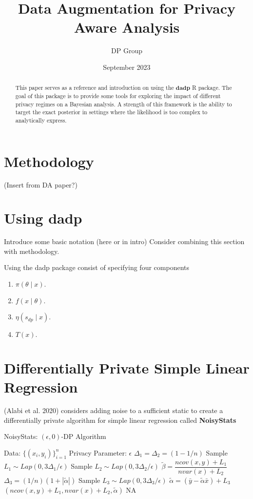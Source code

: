 \documentclass{article}\usepackage[]{graphicx}\usepackage[]{xcolor}
\title{Data Augmentation for Privacy Aware Analysis}
\author{DP Group}
\date{September 2023}
\theoremstyle{definition}
\newcommand{\dpn}{\textbf{dadp}}
\begin{document}
\maketitle

\begin{abstract}
    This paper serves as a reference and introduction on using the $\dpn$ R
    package. The goal of this package is to provide some tools for exploring the
    impact of different privacy regimes on a Bayesian analysis. A strength of
    this framework is the ability to target the exact posterior in settings
    where the likelihood is too complex to analytically express.
\end{abstract}

\section*{Methodology}
(Insert from DA paper?)



\section*{Using dadp}
Introduce some basic notation (here or in intro)
Consider combining this section with methodology.



Using the dadp package consist of specifying four components
\begin{enumerate}
  \item $\pi(\theta \mid x)$.
  \item $f(x \mid \theta)$.
  \item $\eta(s_{dp} \mid x)$.
  \item $T(x)$.
\end{enumerate}



\section*{Differentially Private Simple Linear Regression}

(Alabi et al. 2020)\cite{alabi2020} considers adding noise to a sufficient static
to create a differentially private algorithm for simple linear regression
called \textbf{NoisyStats}


\begin{algorithm}
\begin{algorithmic}[1]
\caption{NoisyStats: $(\epsilon, 0)$-DP Algorithm}
\State Data: $\{(x_i,y_i)\}_{i=1}^{n}$
\State Privacy Parameter: $\epsilon$
\State $\Delta_1 = \Delta_2 = (1 - 1/n)$ 
\State Sample $L_1 \sim Lap(0, 3\Delta_1/\epsilon)$
\State Sample $L_2 \sim Lap(0, 3\Delta_2/\epsilon)$
\State $\tilde{\beta} = \dfrac{ncov(x,y) + L_1}{nvar(x) + L_2}$\\
\State $\Delta_3 = (1/n)(1 + |\tilde{\alpha}|)$
\State Sample $L_3 \sim Lap(0, 3\Delta_3/\epsilon)$
\State $\tilde{\alpha} = (\bar{y} - \tilde{\alpha}\bar{x}) + L_3$
\State \Return $(ncov(x,y) + L_1, nvar(x) + L_2, \tilde{\alpha})$
\EndIf
\State \Return NA
\end{algorithmic}
\end{algorithm}
\end{document}
